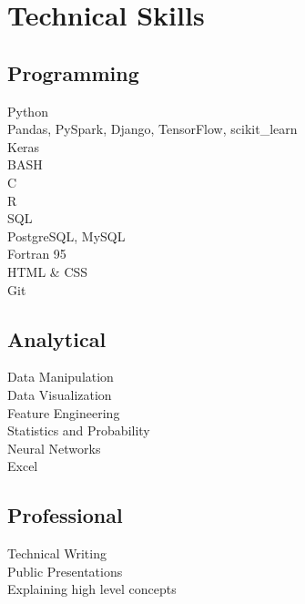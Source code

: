 \documentclass{article}
\begin{document}
\section*{Technical Skills}
\begin{minipage}[t]{0.6\textwidth}
  \subsection*{Programming}
  Python \\
  \-\hspace{0.5cm} \textcolor{light-gray}{Pandas, PySpark, Django, TensorFlow, scikit\_learn \\
  \-\hspace{0.5cm} Keras} \\
  BASH \\
  C \\
  R \\
  SQL \\
  \-\hspace{0.5cm} \textcolor{light-gray}{PostgreSQL, MySQL} \\
  Fortran 95 \\
  HTML \& CSS \\
  Git
\end{minipage}
\begin{minipage}[t]{0.6\textwidth}
  \subsection*{Analytical}
  Data Manipulation \\
  Data Visualization \\
  Feature Engineering \\
  Statistics and Probability \\
  Neural Networks\\
  Excel \\
  \subsection*{Professional}
  Technical Writing \\
  Public Presentations \\
  Explaining high level concepts
\end{minipage}
\end{document}
